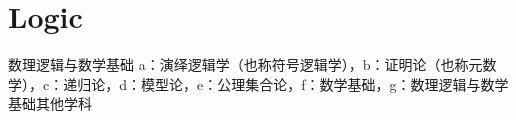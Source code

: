 


\chapter{Logic}

数理逻辑与数学基础
a：演绎逻辑学（也称符号逻辑学），b：证明论（也称元数学），c：递归论，d：模型论，e：公理集合论，f：数学基础，g：数理逻辑与数学基础其他学科
